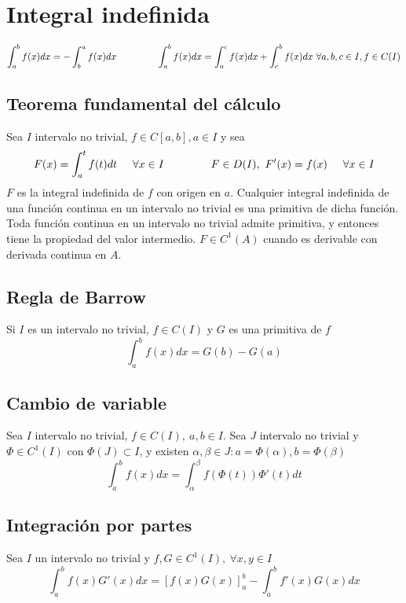 \section{Integral indefinida}
$$ \int_a^b f(x)dx = -\int_b^a f(x)dx \hspace{1.5cm}
\int_a^b f(x)dx = \int_a^c f(x)dx + \int_c^b f(x)dx \ \forall a,b,c\in I, f\in C(I)$$

\subsection{Teorema fundamental del cálculo}
Sea $I$ intervalo no trivial, $f\in C[a,b], a\in I$ y sea
$$ F(x) = \int_a^t f(t) dt \hspace{0.5cm} \forall x\in I\hspace{1.5cm} F\in D(I), \ F'(x) = f(x) \hspace{0.5cm}\forall x\in I$$
$F$ es la integral indefinida de $f$ con origen en $a$.
Cualquier integral indefinida de una función continua en un intervalo no trivial es una primitiva de dicha función. 
Toda función continua en un intervalo no trivial admite primitiva, y entonces tiene la propiedad del valor intermedio.
$F\in C^1(A)$ cuando es derivable con derivada continua en $A$.

\subsection{Regla de Barrow}
Si $I$ es un intervalo no trivial, $f\in C(I)$ y $G$ es una primitiva de $f$
$$ \int_a^b f(x)dx = G(b)-G(a) $$
\subsection{Cambio de variable}
Sea $I$ intervalo no trivial, $f\in C(I), \ a,b\in I$. Sea $J$ intervalo no trivial y $\Phi\in C^1(I)$ con $\Phi(J)\subset I$, y existen $\alpha,\beta\in J : a=\Phi(\alpha),b=\Phi(\beta)$
$$ \int_a^b f(x)dx = \int_{\alpha}^{\beta} f(\Phi(t))\Phi'(t)dt $$

\subsection{Integración por partes}
Sea $I$ un intervalo no trivial y $f,G\in C^1(I), \ \forall x,y\in I$
$$ \int_a^b f(x)G'(x)dx = [f(x)G(x)]_a^b - \int_a^b f'(x)G(x)dx$$